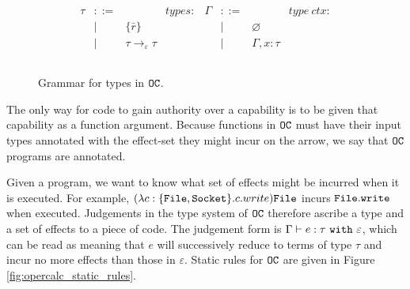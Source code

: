 \begin{figure}[h]
\vspace{-5pt}

\[
\begin{array}{lll}

\begin{array}{lllr}

\tau & ::= & ~ & types: \\
		& | & \{ \bar r \} \\
		& | & \tau \rightarrow_{\varepsilon} \tau \\ 
		&&\\
\end{array}

\begin{array}{lllr}

\Gamma & ::= & ~ & type~ctx: \\
				& | & \varnothing \\
				& | & \Gamma, x: \tau \\
				&&\\
\end{array}

\end{array}
\]

\vspace{-7pt}
\caption{Grammar for types in $\mathtt{OC}$.}
\label{fig:opercalc_types}
\end{figure}

The only way for code to gain authority over a capability is to be given that capability as a function argument. Because functions in $\mathtt{OC}$ must have their input types annotated with the effect-set they might incur on the arrow, we say that $\mathtt{OC}$ programs are annotated.

Given a program, we want to know what set of effects might be incurred when it is executed. For example, $(\lambda c: \{ \mathtt{File, Socket} \}. c.write) \mathtt{File}$ incurs $\mathtt{File.write}$ when executed. Judgements in the type system of $\mathtt{OC}$ therefore ascribe a type and a set of effects to a piece of code. The judgement form is $\Gamma \vdash e: \tau~\mathtt{with}~ \varepsilon$, which can be read as meaning that $e$ will successively reduce to terms of type $\tau$ and incur no more effects than those in $\varepsilon$. Static rules for $\mathtt{OC}$ are given in Figure \ref{fig:opercalc_static_rules}.

